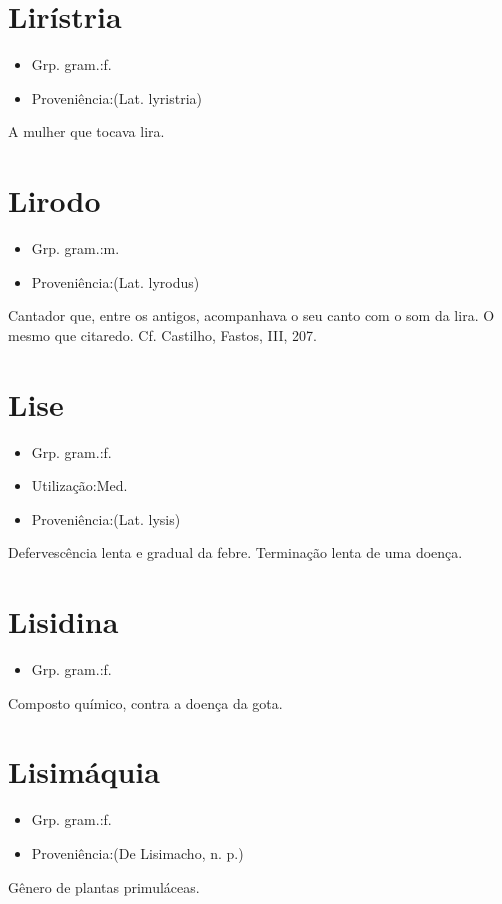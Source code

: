 \section{Lirístria}
\begin{itemize}
\item {Grp. gram.:f.}
\end{itemize}
\begin{itemize}
\item {Proveniência:(Lat. \textunderscore lyristria\textunderscore )}
\end{itemize}
A mulher que tocava lira.
\section{Lirodo}
\begin{itemize}
\item {Grp. gram.:m.}
\end{itemize}
\begin{itemize}
\item {Proveniência:(Lat. \textunderscore lyrodus\textunderscore )}
\end{itemize}
Cantador que, entre os antigos, acompanhava o seu canto com o som da lira.
O mesmo que \textunderscore citaredo\textunderscore . Cf. Castilho, \textunderscore Fastos\textunderscore , III, 207.
\section{Lise}
\begin{itemize}
\item {Grp. gram.:f.}
\end{itemize}
\begin{itemize}
\item {Utilização:Med.}
\end{itemize}
\begin{itemize}
\item {Proveniência:(Lat. \textunderscore lysis\textunderscore )}
\end{itemize}
Defervescência lenta e gradual da febre.
Terminação lenta de uma doença.
\section{Lisidina}
\begin{itemize}
\item {Grp. gram.:f.}
\end{itemize}
Composto químico, contra a doença da gota.
\section{Lisimáquia}
\begin{itemize}
\item {Grp. gram.:f.}
\end{itemize}
\begin{itemize}
\item {Proveniência:(De \textunderscore Lisimacho\textunderscore , n. p.)}
\end{itemize}
Gênero de plantas primuláceas.
